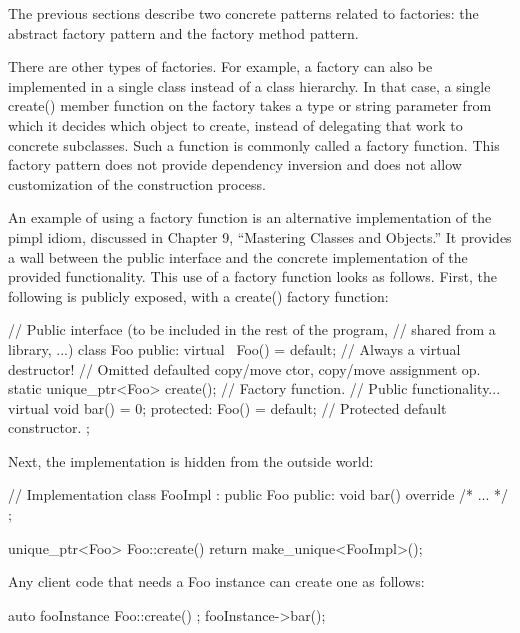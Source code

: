 The previous sections describe two concrete patterns related to factories: the abstract factory pattern and the factory method pattern.

There are other types of factories. For example, a factory can also be implemented in a single class instead of a class hierarchy. In that case, a single create() member function on the factory takes a type or string parameter from which it decides which object to create, instead of delegating that work to concrete subclasses. Such a function is commonly called a factory function. This factory pattern does not provide dependency inversion and does not allow customization of the construction process.

An example of using a factory function is an alternative implementation of the pimpl idiom, discussed in Chapter 9, “Mastering Classes and Objects.” It provides a wall between the public interface and the concrete implementation of the provided functionality. This use of a factory function looks as follows. First, the following is publicly exposed, with a create() factory function:

\begin{cpp}
// Public interface (to be included in the rest of the program,
// shared from a library, ...)
class Foo
{
    public:
        virtual ~Foo() = default; // Always a virtual destructor!
        // Omitted defaulted copy/move ctor, copy/move assignment op.
        static unique_ptr<Foo> create(); // Factory function.
        // Public functionality...
        virtual void bar() = 0;
    protected:
        Foo() = default; // Protected default constructor.
};
\end{cpp}

Next, the implementation is hidden from the outside world:

\begin{cpp}
// Implementation
class FooImpl : public Foo
{
    public:
    void bar() override { /* ... */ }
};

unique_ptr<Foo> Foo::create()
{
    return make_unique<FooImpl>();
}
\end{cpp}

Any client code that needs a Foo instance can create one as follows:

\begin{cpp}
auto fooInstance { Foo::create() };
fooInstance->bar();
\end{cpp}
